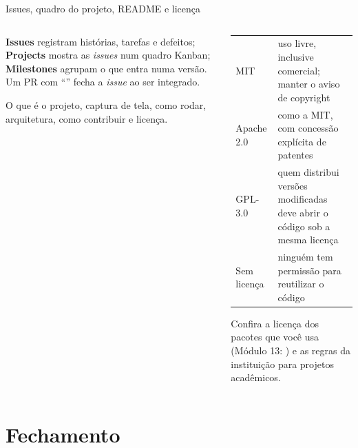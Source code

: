 \documentclass[aspectratio=169,10pt]{beamer}
\begin{document}
\begin{frame}{Issues, quadro do projeto, README e licença}
  \begin{columns}[T]
    \begin{column}{0.5\textwidth}
      \begin{conceito}
        \textbf{Issues} registram histórias, tarefas e defeitos; \textbf{Projects} mostra as \emph{issues} num quadro Kanban; \textbf{Milestones} agrupam o que entra numa versão. Um PR com ``'' fecha a \emph{issue} ao ser integrado.
      \end{conceito}
      \begin{conceito}
        O que é o projeto, captura de tela, como rodar, arquitetura, como contribuir e licença.
      \end{conceito}
    \end{column}
    \begin{column}{0.48\textwidth}
      \scriptsize
      \begin{tabularx}{\linewidth}{@{}l L@{}}
        \toprule
         &  \\
        \midrule
        MIT & uso livre, inclusive comercial; manter o aviso de copyright \\
        Apache 2.0 & como a MIT, com concessão explícita de patentes \\
        GPL-3.0 & quem distribui versões modificadas deve abrir o código sob a mesma licença \\
        Sem licença & ninguém tem permissão para reutilizar o código \\
        \bottomrule
      \end{tabularx}
      \begin{atencao}
        Confira a licença dos pacotes que você usa (Módulo 13: ) e as regras da instituição para projetos acadêmicos.
      \end{atencao}
    \end{column}
  \end{columns}
\end{frame}

\section{Fechamento}
\end{document}
